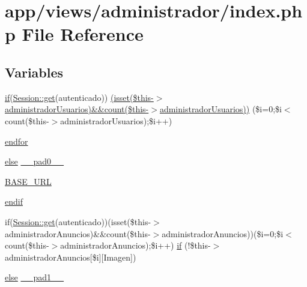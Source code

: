 \hypertarget{app_2views_2administrador_2index_8php}{}\section{app/views/administrador/index.php File Reference}
\label{app_2views_2administrador_2index_8php}
\subsection*{Variables}
\begin{DoxyCompactItemize}
\item 
\hyperlink{app_2views_2index_2index_8php_a3d726968fd3dc3d64cac837a26187799}{if}(\hyperlink{class_session_a5b48fff21f9141b53ba79506b6b4375e}{Session\+::get}(\textquotesingle{}autenticado\textquotesingle{})) \hyperlink{app_2views_2administrador_2index_8php_a23a3143f121239efb4af17dad423d531}{(isset(\$this-\/$>$administrador\+Usuarios)\&\&count(\$this-\/$>$administrador\+Usuarios))} (\$i=0;\$i$<$ count(\$this-\/$>$administrador\+Usuarios);\$i++)
\item 
\hyperlink{app_2views_2administrador_2index_8php_ae8fdc27183f296411bac00ed522ee1ac}{endfor}
\item 
\hyperlink{header_8php_aafe3d66a75b8195106636aa01f257a66}{else} \hyperlink{app_2views_2administrador_2index_8php_a8e01dcc96c43199448ee66f7c2ae8ea6}{\+\_\+\+\_\+pad0\+\_\+\+\_\+}
\item 
\hyperlink{app_2views_2administrador_2index_8php_a16548ab75ed30cbddce178d56d26dbb8}{B\+A\+S\+E\+\_\+\+U\+R\+L}
\item 
\hyperlink{app_2views_2administrador_2index_8php_a82cd33ca97ff99f2fcc5e9c81d65251b}{endif}
\item 
if(\hyperlink{class_session_a5b48fff21f9141b53ba79506b6b4375e}{Session\+::get}(\textquotesingle{}autenticado\textquotesingle{}))(isset(\$this-\/$>$administrador\+Anuncios)\&\&count(\$this-\/$>$administrador\+Anuncios))(\$i=0;\$i$<$ count(\$this-\/$>$administrador\+Anuncios);\$i++) \hyperlink{app_2views_2administrador_2index_8php_ae77fe5d5581154505c18abb7c6309c5b}{if} (!\$this-\/$>$administrador\+Anuncios\mbox{[}\$i\mbox{]}\mbox{[}\textquotesingle{}Imagen\textquotesingle{}\mbox{]})
\item 
\hyperlink{header_8php_aafe3d66a75b8195106636aa01f257a66}{else} \hyperlink{app_2views_2administrador_2index_8php_ae8b4bb1441c6ab4dcb28a37bc46c8ead}{\+\_\+\+\_\+pad1\+\_\+\+\_\+}
\end{DoxyCompactItemize}


